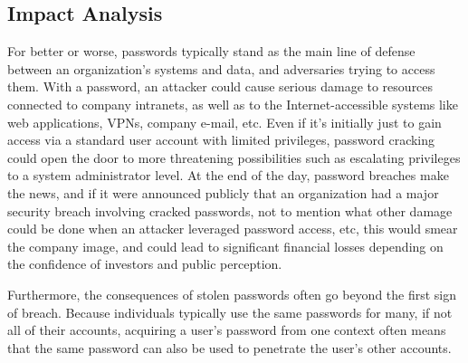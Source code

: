 \subsection{Impact Analysis}
For better or worse, passwords typically stand as the main line of defense between an organization's systems and data, and adversaries trying to access them. With a password, an attacker could cause serious damage to resources connected to company intranets, as well as to the Internet-accessible systems like web applications, VPNs, company e-mail, etc. Even if it’s initially just to gain access via a standard user account with limited privileges, password cracking could open the door to more threatening possibilities such as escalating privileges to a system administrator level. At the end of the day, password breaches make the news, and if it were announced publicly that an organization had a major security breach involving cracked passwords, not to mention what other damage could be done when an attacker leveraged password access, etc, this would smear the company image, and could lead to significant financial losses depending on the confidence of investors and public perception.

Furthermore, the consequences of stolen passwords often go beyond the first sign of breach. Because individuals typically use the same passwords for many, if not all of their accounts, acquiring a user’s password from one context often means that the same password can also be used to penetrate the user’s other accounts.

